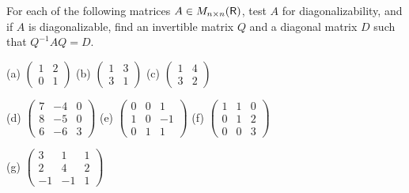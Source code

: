 \begin{exercise} \label{exercise 5.2.2}
For each of the following matrices \(A \in M_{n \times n}(\textsf{R})\), test \(A\) for diagonalizability, and if \(A\) is diagonalizable, find an invertible matrix \(Q\) and a diagonal matrix \(D\) such that \(Q^{-1}AQ = D\).

(a) \(\left(\begin{array}{ll}1 & 2 \\ 0 & 1\end{array}\right)\)
\quad \quad \quad
(b) \(\left(\begin{array}{ll}1 & 3 \\ 3 & 1\end{array}\right)\)
\quad \quad \quad
(c) \(\left(\begin{array}{ll}1 & 4 \\ 3 & 2\end{array}\right)\)

(d) \(\left(\begin{array}{lll}7 & -4 & 0 \\ 8 & -5 & 0 \\ 6 & -6 & 3\end{array}\right)\)
\quad
(e) \(\left(\begin{array}{rrr}0 & 0 & 1 \\ 1 & 0 & -1 \\ 0 & 1 & 1\end{array}\right)\)
\quad
(f) \(\left(\begin{array}{lll}1 & 1 & 0 \\ 0 & 1 & 2 \\ 0 & 0 & 3\end{array}\right)\)

(g) \(\left(\begin{array}{rrr}3 & 1 & 1 \\ 2 & 4 & 2 \\ -1 & -1 & 1\end{array}\right)\)
\end{exercise}

